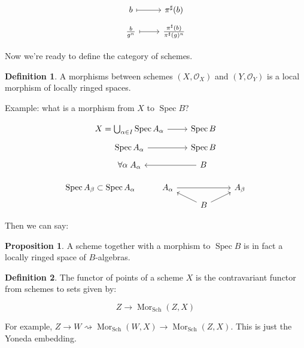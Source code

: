 \documentclass{article}
\theoremstyle{definition}
\newtheorem*{definition}{Definition}
\newtheorem{proposition}[theorem]{Proposition}
\begin{document}
    \[
        \begin{tikzcd}[row sep = tiny]
            b \ar[r,mapsto] & \pi^\sharp(b) \\
            \frac{b}{g^n} \ar[r,mapsto] & \frac{\pi^\sharp(b)}{\pi^{\sharp}(g)^n}
        \end{tikzcd}
    \]

    Now we're ready to define the category of schemes.

    \begin{definition}
        A morphisms between schemes \((X, \mathcal{O}_X)\) and \((Y, \mathcal{O}_Y)\) is a local morphism of locally ringed spaces.
    \end{definition}

    Example: what is a morphism from \(X\) to \(\operatorname{Spec} B\)?

    \[
        \begin{tikzcd}[row sep = tiny]
            X = \bigcup_{\alpha \in I} \operatorname{Spec} A_\alpha \ar[r] & \operatorname{Spec} B \\ \operatorname{Spec} A_\alpha \ar[r] & \operatorname{Spec} B \\ \forall \alpha \; A_\alpha & B \ar[l]
        \end{tikzcd}
    \]

    \[
        \begin{tikzcd}[row sep = tiny]
            \operatorname{Spec} A_\beta  \subset \operatorname{Spec} A_\alpha & A_\alpha \ar[rr] & & A_\beta \\ & &  B \ar[ru] \ar[lu]
        \end{tikzcd}
    \]

    Then we can say:

    \begin{proposition}
        A scheme together with a morphism to \(\operatorname{Spec} B\) is in fact a locally ringed space of \(B\)-algebras.
    \end{proposition}

    \begin{definition}
        The functor of points of a scheme \(X\) is the contravariant functor from schemes to sets given by:

        \[
            Z \to \operatorname{Mor}_{\text{Sch}} (Z, X)
        \]

        For example, \(Z \to W \rightsquigarrow \operatorname{Mor}_{\text{Sch}}(W,X) \to \operatorname{Mor}_{\text{Sch}}(Z,X)\). This is just the Yoneda embedding. 
    \end{definition}
\end{document}
